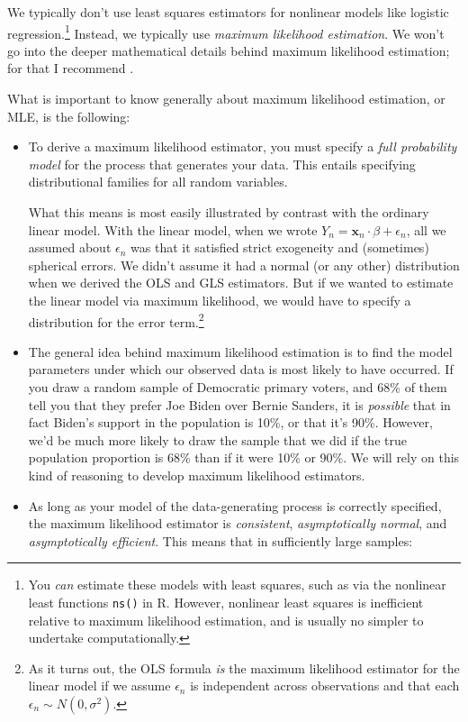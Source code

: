 \documentclass[
  12pt,
  oneside,openany]{book}
\begin{document}
We typically don't use least squares estimators for nonlinear models like logistic regression.\footnote{You \emph{can} estimate these models with least squares, such as via the nonlinear least functions \texttt{ns()} in R. However, nonlinear least squares is inefficient relative to maximum likelihood estimation, and is usually no simpler to undertake computationally.}
Instead, we typically use \emph{maximum likelihood estimation}.
We won't go into the deeper mathematical details behind maximum likelihood estimation; for that I recommend \citet{davidson1993estimation}.

What is important to know generally about maximum likelihood estimation, or MLE, is the following:

\begin{itemize}
\item
  To derive a maximum likelihood estimator, you must specify a \emph{full probability model} for the process that generates your data.
  This entails specifying distributional families for all random variables.

  What this means is most easily illustrated by contrast with the ordinary linear model.
  With the linear model, when we wrote \(Y_n = \mathbf{x}_n \cdot \beta + \epsilon_n\), all we assumed about \(\epsilon_n\) was that it satisfied strict exogeneity and (sometimes) spherical errors.
  We didn't assume it had a normal (or any other) distribution when we derived the OLS and GLS estimators.
  But if we wanted to estimate the linear model via maximum likelihood, we would have to specify a distribution for the error term.\footnote{As it turns out, the OLS formula \emph{is} the maximum likelihood estimator for the linear model if we assume \(\epsilon_n\) is independent across observations and that each \(\epsilon_n \sim N(0, \sigma^2)\).}
\item
  The general idea behind maximum likelihood estimation is to find the model parameters under which our observed data is most likely to have occurred.
  If you draw a random sample of Democratic primary voters, and 68\% of them tell you that they prefer Joe Biden over Bernie Sanders, it is \emph{possible} that in fact Biden's support in the population is 10\%, or that it's 90\%.
  However, we'd be much more likely to draw the sample that we did if the true population proportion is 68\% than if it were 10\% or 90\%.
  We will rely on this kind of reasoning to develop maximum likelihood estimators.
\item
  As long as your model of the data-generating process is correctly specified, the maximum likelihood estimator is \emph{consistent}, \emph{asymptotically normal}, and \emph{asymptotically efficient}.
  This means that in sufficiently large samples:


\end{itemize}
\end{document}
